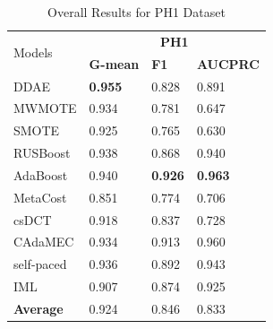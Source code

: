 \begin{table}[H]
    \centering
    \renewcommand\arraystretch{0.85}
    \begin{tabular}{|p{}<{\centering}|p{}<{\centering}|p{}<{\centering}|p{}<{\centering}|}
    \hline
    \multirow{2}{*}{Models} & \multicolumn{3}{c|}{\textbf{PH1}}    \\ \cline{2-4} 
                             & \textbf{G-mean} & \textbf{F1} & \textbf{AUCPRC} \\ \hline
    DDAE                     & \textbf{0.955}	&0.828	&0.891               \\ \hline
    MWMOTE                   &0.934	&0.781	&0.647                \\ \hline
    SMOTE                    & 0.925	&0.765	&0.630                \\ \hline
    RUSBoost                 & 0.938	&0.868	&0.940                \\ \hline
    AdaBoost                 & 0.940	&\textbf{0.926}	&\textbf{0.963}                \\ \hline
    MetaCost                 & 0.851	&0.774	&0.706               \\ \hline
    csDCT                    & 0.918	&0.837	&0.728                \\ \hline
    CAdaMEC                  & 0.934	&0.913	&0.960               \\ \hline
    self-paced               & 0.936	&0.892	&0.943                 \\ \hline
    IML                      & 0.907	&0.874	&0.925               \\ \hline\hline
    \textbf{Average}         & 0.924	&0.846	&0.833                 \\ \hline
    \end{tabular}
    \vspace{-8pt}
    \caption{Overall Results for PH1 Dataset}
    \label{tab10}
\end{table}

